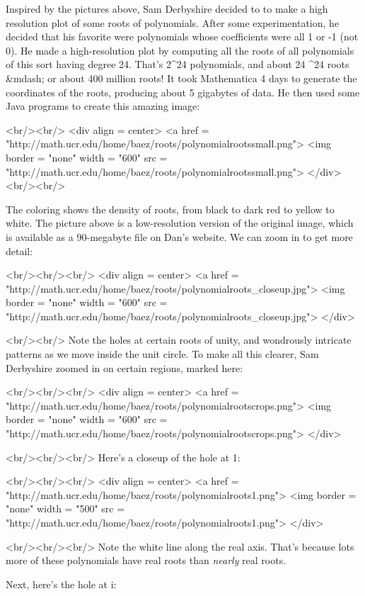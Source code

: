 Inspired by the pictures above, Sam Derbyshire decided to to make a
high resolution plot of some roots of polynomials.  After some
experimentation, he decided that his favorite were polynomials whose
coefficients were all 1 or -1 (not 0).  He made a high-resolution plot
by computing all the roots of all polynomials of this sort having
degree 24.  That's 2^{24} polynomials, and about 24 ^{24} roots &mdash; or about 400 million roots!  It took
Mathematica 4 days to generate the coordinates of the roots, producing
about 5 gigabytes of data.  He then used some Java programs to create
this amazing image:  

<br/><br/>
<div align = center>
<a href = "http://math.ucr.edu/home/baez/roots/polynomialrootssmall.png">
<img border = "none" width = "600" src = "http://math.ucr.edu/home/baez/roots/polynomialrootssmall.png">
</div>
<br/><br/>

The coloring shows the density of roots, from black to dark red to
yellow to white.  The picture above is a low-resolution version of the
original image, which is available as a 90-megabyte file on Dan's
website.  We can zoom in to get more detail:

<br/><br/><br/>
<div align = center>
<a href = "http://math.ucr.edu/home/baez/roots/polynomialroots_closeup.jpg">
<img border = "none" width = "600" src = "http://math.ucr.edu/home/baez/roots/polynomialroots_closeup.jpg">
</div>

<br/><br/>
Note the holes at certain roots of unity, and wondrously intricate
patterns as we move inside the unit circle.  To make all this clearer,
Sam Derbyshire zoomed in on certain regions, marked here:

<br/><br/><br/>
<div align = center>
<a href = "http://math.ucr.edu/home/baez/roots/polynomialrootscrops.png">
<img border = "none" width = "600" src = "http://math.ucr.edu/home/baez/roots/polynomialrootscrops.png">
</div>

<br/><br/><br/>
Here's a closeup of the hole at 1:  

<br/><br/><br/>
<div align = center>
<a href = "http://math.ucr.edu/home/baez/roots/polynomialroots1.png">
<img border = "none" width = "500" src = "http://math.ucr.edu/home/baez/roots/polynomialroots1.png">
</div>

<br/><br/><br/>
Note the white line along the real axis.  That's because lots more of
these polynomials have real roots than \emph{nearly} real roots.

Next, here's the hole at i:

